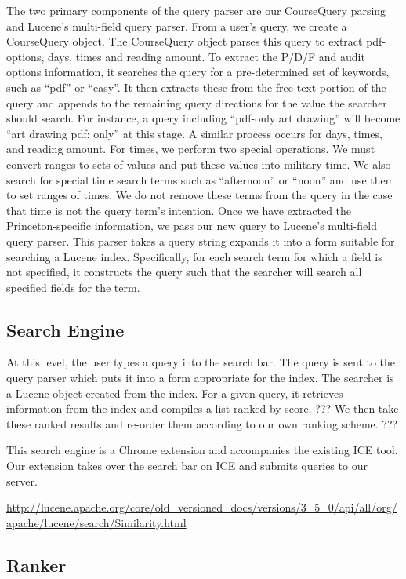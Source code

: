 \documentclass[12pt,letterpaper]{article}
\begin{document}
The two primary components of the query parser are our CourseQuery parsing and Lucene's multi-field query parser. From a user's query, we create a CourseQuery object. The CourseQuery object parses this query to extract pdf-options, days, times and reading amount. To extract the P/D/F and audit options information, it searches the query for a pre-determined set of keywords, such as ``pdf'' or ``easy''. It then extracts these from the free-text portion of the query and appends to the remaining query directions for the value the searcher should search. For instance, a query including ``pdf-only art drawing'' will become ``art drawing pdf: only'' at this stage. A similar process occurs for days, times, and reading amount. For times, we perform two special operations. We must convert ranges to sets of values and put these values into military time. We also search for special time search terms such as ``afternoon'' or ``noon'' and use them to set ranges of times. We do not remove these terms from the query in the case that time is not the query term's intention. Once we have extracted the Princeton-specific information, we pass our new query to Lucene's multi-field query parser. This parser takes a query string expands it into a form suitable for searching a Lucene index. Specifically, for each search term for which a field is not specified, it constructs the query such that the searcher will search all specified fields for the term. 
	
\subsection{Search Engine}
At this level, the user types a query into the search bar. The query is sent to the query parser which puts it into a form appropriate for the index. The searcher is a Lucene object created from the index. For a given query, it retrieves information from the index and compiles a list ranked by score. ??? We then take these ranked results and re-order them according to our own ranking scheme. ???

This search engine is a Chrome extension and accompanies the existing ICE tool. Our extension takes over the search bar on ICE and submits queries to our server. 
				
\url{http://lucene.apache.org/core/old_versioned_docs/versions/3_5_0/api/all/org/apache/lucene/search/Similarity.html}
		
\subsection{Ranker}
\end{document}
